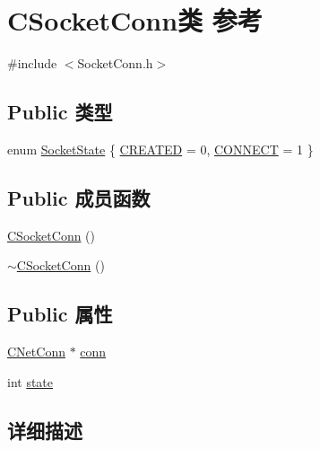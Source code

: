 \hypertarget{class_c_socket_conn}{}\section{C\+Socket\+Conn类 参考}
\label{class_c_socket_conn}


{\ttfamily \#include $<$Socket\+Conn.\+h$>$}

\subsection*{Public 类型}
\begin{DoxyCompactItemize}
\item 
enum \hyperlink{class_c_socket_conn_aff511342b5990495abcfb3319889a10f}{Socket\+State} \{ \hyperlink{class_c_socket_conn_aff511342b5990495abcfb3319889a10fa0be23b9ad265b5f4fb1b79fd455b4462}{C\+R\+E\+A\+T\+ED} = 0, 
\hyperlink{class_c_socket_conn_aff511342b5990495abcfb3319889a10fae95a8269b423b7d2ac6a7820ef91cdd3}{C\+O\+N\+N\+E\+CT} = 1
 \}
\end{DoxyCompactItemize}
\subsection*{Public 成员函数}
\begin{DoxyCompactItemize}
\item 
\hyperlink{class_c_socket_conn_aa9e7dc944c5024fbd8ab3d702064a932}{C\+Socket\+Conn} ()
\item 
\hyperlink{class_c_socket_conn_a4ece15744485f06506faaabd3bc6f6a6}{$\sim$\+C\+Socket\+Conn} ()
\end{DoxyCompactItemize}
\subsection*{Public 属性}
\begin{DoxyCompactItemize}
\item 
\hyperlink{class_c_net_conn}{C\+Net\+Conn} $\ast$ \hyperlink{class_c_socket_conn_a07e98f72e33f3bf788545c1446c5aaeb}{conn}
\item 
int \hyperlink{class_c_socket_conn_a3071170de60991704e2f9a958bfa0b13}{state}
\end{DoxyCompactItemize}


\subsection{详细描述}



